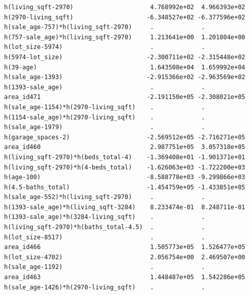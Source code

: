\documentclass[
]{article}
\begin{document}
\begin{verbatim}
h(living_sqft-2970)                     4.768992e+02  4.966393e+02
h(2970-living_sqft)                    -6.348527e+02 -6.377596e+02
h(sale_age-757)*h(living_sqft-2970)     .             .           
h(757-sale_age)*h(living_sqft-2970)     1.213641e+00  1.201804e+00
h(lot_size-5974)                        .             .           
h(5974-lot_size)                       -2.300711e+02 -2.315448e+02
h(39-age)                               1.643508e+04  1.659992e+04
h(sale_age-1393)                       -2.915366e+02 -2.963569e+02
h(1393-sale_age)                        .             .           
area_id471                             -2.191150e+05 -2.308021e+05
h(sale_age-1154)*h(2970-living_sqft)    .             .           
h(1154-sale_age)*h(2970-living_sqft)    .             .           
h(sale_age-1979)                        .             .           
h(garage_spaces-2)                     -2.569512e+05 -2.716271e+05
area_id460                              2.987751e+05  3.057318e+05
h(living_sqft-2970)*h(beds_total-4)    -1.369408e+01 -1.901371e+01
h(living_sqft-2970)*h(4-beds_total)    -1.626063e+03 -1.722200e+03
h(age-100)                             -8.588778e+03 -9.299866e+03
h(4.5-baths_total)                     -1.454759e+05 -1.433851e+05
h(sale_age-552)*h(living_sqft-2970)     .             .           
h(1393-sale_age)*h(living_sqft-3284)    8.233474e-01  8.248711e-01
h(1393-sale_age)*h(3284-living_sqft)    .             .           
h(living_sqft-2970)*h(baths_total-4.5)  .             .           
h(lot_size-8517)                        .             .           
area_id466                              1.505773e+05  1.526477e+05
h(lot_size-4702)                        2.056754e+00  2.469507e+00
h(sale_age-1192)                        .             .           
area_id463                              1.448487e+05  1.542286e+05
h(sale_age-1426)*h(2970-living_sqft)    .             .           
                                                                  

\end{verbatim}
\end{document}
